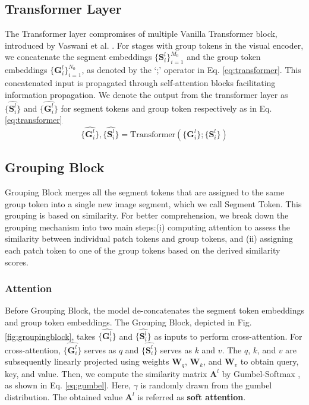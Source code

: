 \subsection{Transformer Layer}
The Transformer layer compromises of multiple Vanilla Transformer block, introduced by Vaswani et al. \cite{vaswani2017attention}. For stages with group tokens in the visual encoder, we concatenate the segment embeddings $\{\textbf{S}_i^{l}\}_{i=1}^{M_0}$ and the group token embeddings $\{\textbf{G}_i^{l}\}_{i=1}^{N_0}$, as denoted by the `;' operator in Eq. \ref{eq:transformer}.
This concatenated input is propagated through self-attention blocks facilitating information propagation. We denote the output from the transformer layer as  $\{\hat{\textbf{S}_i^{l}}\}$ and $\{\hat{\textbf{G}_i^{l}}\}$ for segment tokens and group token respectively as in Eq. \ref{eq:transformer}
\begin{equation}
\label{eq:transformer}
    \{\hat{\textbf{G}_i^{l}}\}, \{\hat{\textbf{S}_i^{l}}\} = \text{Transformer}(\{\textbf{G}_i^{l}\}; \{\textbf{S}_i^{l}\})
\end{equation}

\subsection{Grouping Block}
Grouping Block merges all the segment tokens that are assigned to the same group token into a single new image segment, which we call Segment Token. This grouping is based on similarity.
For better comprehension, we break down the grouping mechanism into two main steps:(i) computing attention to assess the similarity between individual patch tokens and group tokens, and (ii) assigning each patch token to one of the group tokens based on the derived similarity scores.
\subsubsection{Attention}
Before Grouping Block, the model de-concatenates the segment token embeddings and group token embeddings. The Grouping Block, depicted in Fig. \ref{fig:groupingblock}, takes $\{\hat{\textbf{G}_i^{l}}\}$ and $\{\hat{\textbf{S}_i^{l}}\}$ as inputs to perform cross-attention. For cross-attention, $\{\hat{\textbf{G}_i^{l}}\}$ serves as $q$ and $\{\hat{\textbf{S}_i^{l}}\}$ serves as $k$ and $v$. The $q$, $k$, and $v$ are subsequently linearly projected using weights $\textbf{W}_q$, $\textbf{W}_k$, and $\textbf{W}_v$ to obtain query, key, and value. Then, we compute the similarity matrix $\textbf{A}^{l}$ by Gumbel-Softmax \cite{jang2016categorical}\cite{maddison2016concrete}, as shown in Eq. \ref{eq:gumbel}. Here, $\gamma$ is randomly drawn from the gumbel distribution.
The obtained value $\textbf{A}^{l}$ is referred as \textbf{soft attention}.

